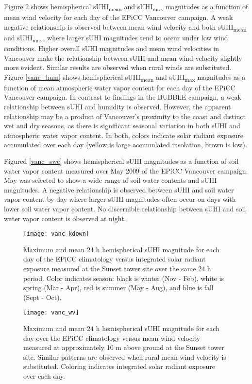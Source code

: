 \begin{bibunit}
Figure \ref{vanc_wv} shows hemispherical sUHI\textsubscript{mean} and sUHI\textsubscript{max} magnitudes as a function of mean wind velocity for each day of the EPiCC Vancouver campaign. A weak negative relationship is observed between mean wind velocity and both sUHI\textsubscript{mean} and sUHI\textsubscript{max}, where larger sUHI magnitudes tend to occur under low wind conditions. Higher overall sUHI magnitudes and mean wind velocities in Vancouver make the relationship between sUHI and mean wind velocity slightly more evident. Similar results are observed when rural winds are substituted. Figure \ref{vanc_hum} shows hemispherical sUHI\textsubscript{mean} and sUHI\textsubscript{max} magnitudes as a function of mean atmospheric water vapor content for each day of the EPiCC Vancouver campaign. In contrast to findings in the BUBBLE campaign, a weak relationship between sUHI and humidity is observed. However, the apparent relationship may be a product of Vancouver’s proximity to the coast and distinct wet and dry seasons, as there is significant seasonal variation in both sUHI and atmospheric water vapor content. In both, colors indicate solar radiant exposure accumulated over each day (yellow is large accumulated insolation, brown is low).

Figured \ref{vanc_swc} shows hemispherical sUHI magnitudes as a function of soil water vapor content measured over May 2009 of the EPiCC Vancouver campaign. May was selected to show a wide range of soil water contents and sUHI magnitudes. A negative relationship is observed between sUHI and soil water vapor content by day where larger sUHI magnitudes often occur on days with lower soil water vapor content. No discernible relationship between sUHI and soil water vapor content is observed at night.

\begin{figure}[H]
	\centering
	\texttt{[image: vanc\_kdown]}
	\caption{Maximum and mean 24 \si{\hour} hemispherical sUHI magnitude for each day of the EPiCC climatology versus integrated solar radiant exposure measured at the Sunset tower site over the same 24 \si{\hour} period. Color indicates season: black is winter (Nov - Feb), white is spring (Mar - Apr), red is summer (May - Aug), and blue is fall (Sept - Oct).}
	\label{vanc_sol}
\end{figure}

\begin{figure}[H]
	\centering
	\texttt{[image: vanc\_wv]}
	\caption{Maximum and mean 24 \si{\hour} hemispherical sUHI magnitude for each day over the EPiCC climatology versus mean wind velocity measured at approximately 10 \si{\meter} above ground at the Sunset tower site. Similar patterns are observed when rural mean wind velocity is substituted. Coloring indicates integrated solar radiant exposure over each day.}
	\label{vanc_wv}
\end{figure}


\end{bibunit}
